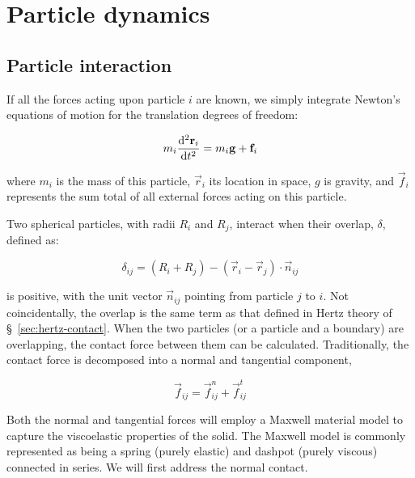 \section{Particle dynamics}\label{sec:particle-dynamics}


\subsection{Particle interaction}

If all the forces acting upon particle $i$ are known, we simply integrate Newton's equations of motion for the translation degrees of freedom:

\begin{equation}\label{eq:newtons-first}
m_i  \frac{\mathrm{d}^2{\mathbf{r}_i}}{\mathrm{d}t^2} = m_i\mathbf{g} + \mathbf{f}_i
\end{equation}



where $m_i$ is the mass of this particle, $\vec{r}_i$ its location in space, $g$ is gravity, and $\vec{f}_i$ represents the sum total of all external forces acting on this particle. %



Two spherical particles, with radii $R_i$ and $R_j$, interact when their overlap, $\delta$, defined as:

\begin{equation}
	\delta_{ij} = (R_i + R_j) - (\vec{r}_i -\vec{r}_j)\cdot \vec{n}_{ij}
\end{equation}

is positive, with the unit vector $\vec{n}_{ij}$ pointing from particle $j$ to $i$. Not coincidentally, the overlap is the same term as that defined in Hertz theory of \S~\ref{sec:hertz-contact}. When the two particles (or a particle and a boundary) are overlapping, the contact force between them can be calculated. Traditionally, the contact force is decomposed into a normal and tangential component,

\begin{equation}
	\vec{f}_{ij} = \vec{f}^n_{ij} + \vec{f}^t_{ij}
\end{equation}

Both the normal and tangential forces will employ a Maxwell material model to capture the viscoelastic properties of the solid. The Maxwell model is commonly represented as being a spring (purely elastic) and dashpot (purely viscous) connected in series. We will first address the normal contact.






